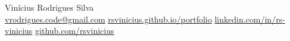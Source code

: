 \documentclass[a4paper,10pt]{article}
\begin{document}
\begin{center}
    {\Huge Vinícius Rodrigues Silva} \\ \vspace{3pt}
    \small
    \href{mailto:vrodrigues.code@gmail.com}{\faEnvelope \thinspace \thinspace vrodrigues.code@gmail.com} \quad
    \href{https://rsvinicius.github.io/portfolio/}{\faGlobe \thinspace \thinspace rsvinicius.github.io/portfolio} \quad
    \href{https://www.linkedin.com/in/rs-vinicius/}{\faLinkedin \thinspace \thinspace linkedin.com/in/rs-vinicius} \quad
    \href{https://github.com/rsvinicius}{\faGithub \thinspace \thinspace github.com/rsvinicius}
\end{center}
\vspace{-6pt}





\end{document}
